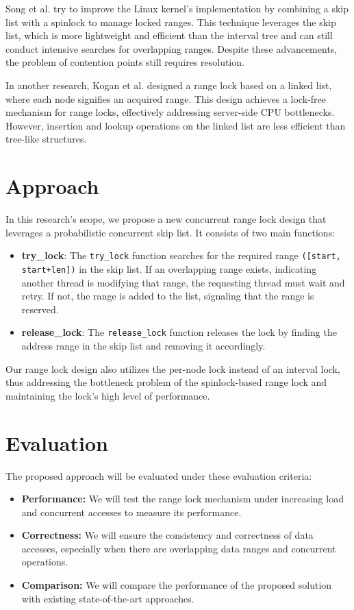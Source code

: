 Song et al.\parencite{song2013parallelizing} try to improve the Linux kernel's implementation by combining a skip list with a spinlock to manage locked ranges. This technique leverages the skip list, which is more lightweight and efficient than the interval tree and can still conduct intensive searches for overlapping ranges. Despite these advancements, the problem of contention points still requires resolution.

In another research, Kogan et al.\cite{kogan2020scalable} designed a range lock based on a linked list, where each node signifies an acquired range. This design achieves a lock-free mechanism for range locks, effectively addressing server-side CPU bottlenecks. However, insertion and lookup operations on the linked list are less efficient than tree-like structures. 

\newpage

\section{Approach}
In this research's scope, we propose a new concurrent range lock design that leverages a probabilistic concurrent skip list\parencite{herlihy2006provably, herlihy2020art}. It consists of two main functions:
\begin{itemize}
    \item \textbf{try\_lock}: The \texttt{try\_lock} function searches for the required range \texttt{([start, start+len])} in the skip list. If an overlapping range exists, indicating another thread is modifying that range, the requesting thread must wait and retry. If not, the range is added to the list, signaling that the range is reserved.
    \item \textbf{release\_lock}: The \texttt{release\_lock} function releases the lock by finding the address range in the skip list and removing it accordingly.
\end{itemize} 

Our range lock design also utilizes the per-node lock instead of an interval lock, thus addressing the bottleneck problem of the spinlock-based range lock and maintaining the lock's high level of performance. 

\section{Evaluation}
The proposed approach will be evaluated under these evaluation criteria:
\begin{itemize}
    \item \textbf{Performance:} We will test the range lock mechanism under increasing load and concurrent accesses to measure its performance.
    \item \textbf{Correctness:} We will ensure the consistency and correctness of data accesses, especially when there are overlapping data ranges and concurrent operations.
    \item \textbf{Comparison:} We will compare the performance of the proposed solution with existing state-of-the-art approaches.
\end{itemize}

